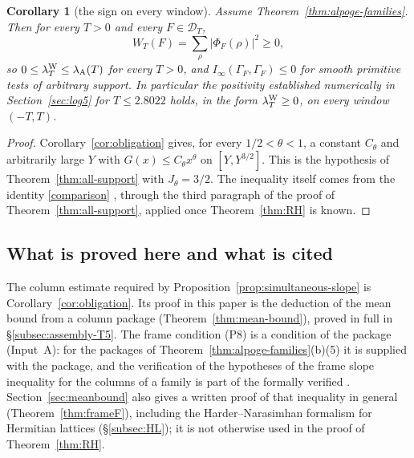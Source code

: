 \documentclass[10pt]{amsart}
\newtheorem{corollary}[theorem]{Corollary}
\theoremstyle{definition}
\theoremstyle{remark}
\begin{document}
\begin{corollary}[the sign on every window]\label{cor:all-windows}
Assume Theorem~\ref{thm:alpoge-families}. Then for every $T>0$ and every
$F\in\mathcal D_T$,
\[
 W_T(F)=\sum_\rho|\Phi_F(\rho)|^2\ge0 ,
\]
so $0\le\lambda^{\rm W}_T\le\lambda_{\rm A}(T)$ for every $T>0$, and
$I_\infty(\Gamma_F,\Gamma_F)\le0$ for smooth primitive tests of arbitrary
support. In particular the positivity established numerically in
Section~\ref{sec:log5} for $T\le2.8022$ holds, in the form
$\lambda^{\rm W}_T\ge0$, on every window $(-T,T)$.
\end{corollary}
\begin{proof}
Corollary~\ref{cor:obligation} gives, for every $1/2<\theta<1$, a constant
$C_\theta$ and arbitrarily large $Y$ with $G(x)\le C_\theta x^\theta$ on
$[Y,Y^{3/2}]$. This is the hypothesis of Theorem~\ref{thm:all-support}
with $J_\theta=3/2$. The inequality itself comes from the identity \eqref{comparison}
\cite[Theorem~4.1]{Paper45}, through the third paragraph of the proof of
Theorem~\ref{thm:all-support}, applied once Theorem~\ref{thm:RH} is known.
\end{proof}

\subsection*{What is proved here and what is cited}
The column estimate required by Proposition~\ref{prop:simultaneous-slope} is
Corollary~\ref{cor:obligation}. Its proof in this paper is the deduction of
the mean bound from a column package (Theorem~\ref{thm:mean-bound}), proved
in full in \S\ref{subsec:assembly-T5}. The frame condition (P8) is a
condition of the package (Input~A): for the packages of
Theorem~\ref{thm:alpoge-families}(b)(5) it is supplied with the package, and
the verification of the hypotheses of the frame slope inequality for the
columns of a family is part of the formally verified
\cite[Proposition~\ref{A-i4:Lprop-fam}(b)]{Annex}. Section~\ref{sec:meanbound}
also gives a written proof of that inequality in general
(Theorem~\ref{thm:frameF}), including the Harder--Narasimhan formalism for
Hermitian lattices (\S\ref{subsec:HL}); it is not otherwise used in the proof
of Theorem~\ref{thm:RH}.
\end{document}
